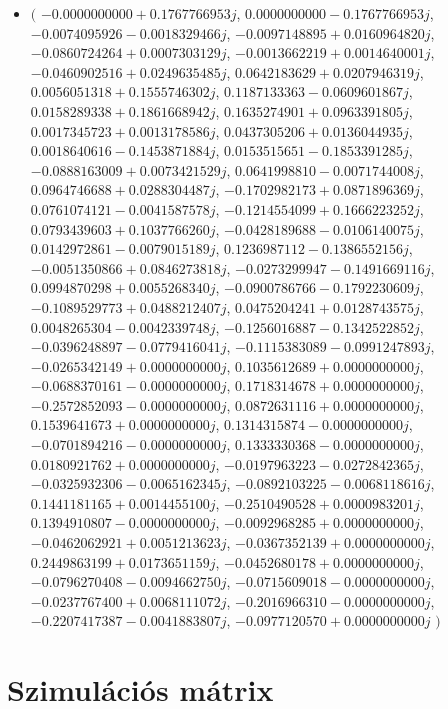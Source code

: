 \documentclass[14pt,a4paper]{article}
\begin{document}
\begin{itemize}
\item
$\big($
$-0.0000000000+0.1767766953j$, $0.0000000000-0.1767766953j$, $-0.0074095926-0.0018329466j$, $-0.0097148895+0.0160964820j$, $-0.0860724264+0.0007303129j$, $-0.0013662219+0.0014640001j$, $-0.0460902516+0.0249635485j$, $0.0642183629+0.0207946319j$, $0.0056051318+0.1555746302j$, $0.1187133363-0.0609601867j$, $0.0158289338+0.1861668942j$, $0.1635274901+0.0963391805j$, $0.0017345723+0.0013178586j$, $0.0437305206+0.0136044935j$, $0.0018640616-0.1453871884j$, $0.0153515651-0.1853391285j$, $-0.0888163009+0.0073421529j$, $0.0641998810-0.0071744008j$, $0.0964746688+0.0288304487j$, $-0.1702982173+0.0871896369j$, $0.0761074121-0.0041587578j$, $-0.1214554099+0.1666223252j$, $0.0793439603+0.1037766260j$, $-0.0428189688-0.0106140075j$, $0.0142972861-0.0079015189j$, $0.1236987112-0.1386552156j$, $-0.0051350866+0.0846273818j$, $-0.0273299947-0.1491669116j$, $0.0994870298+0.0055268340j$, $-0.0900786766-0.1792230609j$, $-0.1089529773+0.0488212407j$, $0.0475204241+0.0128743575j$, $0.0048265304-0.0042339748j$, $-0.1256016887-0.1342522852j$, $-0.0396248897-0.0779416041j$, $-0.1115383089-0.0991247893j$, $-0.0265342149+0.0000000000j$, $0.1035612689+0.0000000000j$, $-0.0688370161-0.0000000000j$, $0.1718314678+0.0000000000j$, $-0.2572852093-0.0000000000j$, $0.0872631116+0.0000000000j$, $0.1539641673+0.0000000000j$, $0.1314315874-0.0000000000j$, $-0.0701894216-0.0000000000j$, $0.1333330368-0.0000000000j$, $0.0180921762+0.0000000000j$, $-0.0197963223-0.0272842365j$, $-0.0325932306-0.0065162345j$, $-0.0892103225-0.0068118616j$, $0.1441181165+0.0014455100j$, $-0.2510490528+0.0000983201j$, $0.1394910807-0.0000000000j$, $-0.0092968285+0.0000000000j$, $-0.0462062921+0.0051213623j$, $-0.0367352139+0.0000000000j$, $0.2449863199+0.0173651159j$, $-0.0452680178+0.0000000000j$, $-0.0796270408-0.0094662750j$, $-0.0715609018-0.0000000000j$, $-0.0237767400+0.0068111072j$, $-0.2016966310-0.0000000000j$, $-0.2207417387-0.0041883807j$, $-0.0977120570+0.0000000000j$
$\big)$
\end{itemize}
\section{Szimulációs mátrix}
\end{document}
